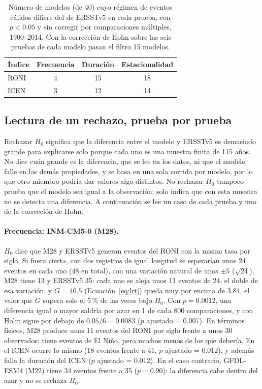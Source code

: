 \documentclass[11pt,a4paper]{article}
\begin{document}
\begin{table}[htbp]
\caption[Rechazos de las pruebas del régimen de eventos.]{Número de modelos (de 40) cuyo régimen de eventos cálidos difiere del de ERSSTv5 en cada prueba, con $p < 0.05$ y sin corregir por comparaciones múltiples, 1900--2014. Con la corrección de Holm sobre las seis pruebas de cada modelo pasan el filtro 15 modelos.}
\label{tab:filtro}
\centering
\small
\begin{tabular}{@{}lccc@{}}
\toprule
\textbf{Índice} & \textbf{Frecuencia} & \textbf{Duración} & \textbf{Estacionalidad} \\
\midrule
RONI & 4 & 15 & 18 \\
ICEN & 3 & 12 & 14 \\
\bottomrule
\end{tabular}
\end{table}

\subsection{Lectura de un rechazo, prueba por prueba}
\label{sec:lectura_pruebas}

Rechazar $H_0$ significa que la diferencia entre el modelo y ERSSTv5 es demasiado grande para explicarse solo porque cada uno es una muestra finita de 115 años. No dice cuán grande es la diferencia, que se lee en los datos, ni que el modelo falle en las demás propiedades, y se basa en una sola corrida por modelo, por lo que otro miembro podría dar valores algo distintos. No rechazar $H_0$ tampoco prueba que el modelo sea igual a la observación: solo indica que con esta muestra no se detecta una diferencia. A continuación se lee un caso de cada prueba y uno de la corrección de Holm.

\paragraph{Frecuencia: INM-CM5-0 (M28).} $H_0$ dice que M28 y ERSSTv5 generan eventos del RONI con la misma tasa por siglo. Si fuera cierta, con dos registros de igual longitud se esperarían unos 24 eventos en cada uno (48 en total), con una variación natural de unos $\pm5$ ($\sqrt{24}$). M28 tiene 13 y ERSSTv5 35: cada uno se aleja unos 11 eventos de 24, el doble de esa variación, y $G = 10.5$ (Ecuación~\eqref{eq:lrt}) queda muy por encima de 3.84, el valor que $G$ supera solo el 5\,\% de las veces bajo $H_0$. Con $p = 0.0012$, una diferencia igual o mayor saldría por azar en 1 de cada 800 comparaciones, y con Holm sigue por debajo de $0.05/6 = 0.0083$ ($p$ ajustado = 0.007). En términos físicos, M28 produce unos 11 eventos del RONI por siglo frente a unos 30 observados: tiene eventos de El Niño, pero muchos menos de los que debería. En el ICEN ocurre lo mismo (18 eventos frente a 41, $p$ ajustado = 0.012), y además falla la duración del ICEN ($p$ ajustado = 0.012). En el caso contrario, GFDL-ESM4 (M22) tiene 34 eventos frente a 35 ($p = 0.90$): la diferencia cabe dentro del azar y no se rechaza $H_0$.
\end{document}
